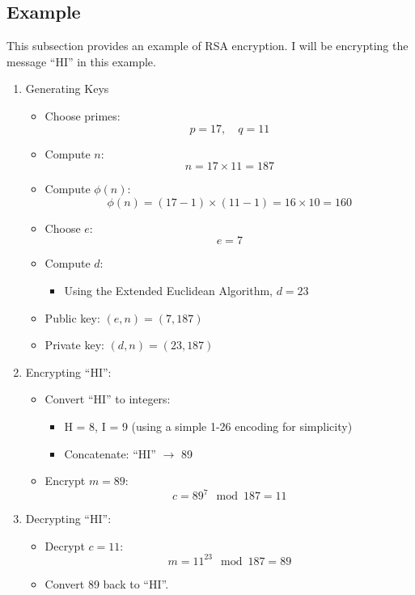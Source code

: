 \documentclass[11pt]{article}
\begin{document}
\subsection{Example}
This subsection provides an example of RSA encryption.
I will be encrypting the message ``HI'' in this example.
\begin{enumerate}
    \item Generating Keys
    \begin{itemize}
        \item Choose primes:
        \[
        p = 17, \quad q = 11
        \]
        \item Compute \( n \):
        \[
        n = 17 \times 11 = 187
        \]
        \item Compute \( \phi(n) \):
        \[
        \phi(n) = (17 - 1) \times (11 - 1) = 16 \times 10 = 160
        \]
        \item Choose \( e \):
        \[
        e = 7
        \]
        \item Compute \( d \):
        \begin{itemize}
            \item Using the Extended Euclidean Algorithm, \( d = 23 \)
        \end{itemize}
        \item Public key: \( (e,n) = (7,187) \)
        \item Private key: \( (d,n) = (23,187) \)
    \end{itemize}
    
    \item Encrypting ``HI'':
    \begin{itemize}
        \item Convert ``HI'' to integers:
        \begin{itemize}
            \item H = 8, I = 9 (using a simple 1-26 encoding for simplicity)
            \item Concatenate: ``HI'' \( \rightarrow \) 89
        \end{itemize}
        \item Encrypt \( m = 89 \):
        \[
        c = 89^7 \mod 187 = 11
        \]
    \end{itemize}
    
    \item Decrypting ``HI'':
    \begin{itemize}
        \item Decrypt \( c = 11 \):
        \[
        m = 11^{23} \mod 187 = 89
        \]
        \item Convert 89 back to ``HI''.
    \end{itemize}
\end{enumerate}
\end{document}
